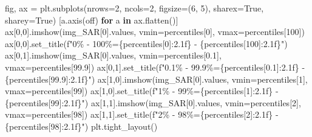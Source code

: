\documentclass[
  11pt,
  letterpaper,
  open=any,
  twoside=false,
  french]{scrbook}
\newenvironment{Shaded}{\begin{snugshade}}{\end{snugshade}}
\newcommand{\ControlFlowTok}[1]{\textcolor[rgb]{0.00,0.23,0.31}{\textbf{#1}}}
\newcommand{\DecValTok}[1]{\textcolor[rgb]{0.68,0.00,0.00}{#1}}
\newcommand{\FloatTok}[1]{\textcolor[rgb]{0.68,0.00,0.00}{#1}}
\newcommand{\KeywordTok}[1]{\textcolor[rgb]{0.00,0.23,0.31}{\textbf{#1}}}
\newcommand{\NormalTok}[1]{\textcolor[rgb]{0.00,0.23,0.31}{#1}}
\newcommand{\OperatorTok}[1]{\textcolor[rgb]{0.37,0.37,0.37}{#1}}
\newcommand{\SpecialCharTok}[1]{\textcolor[rgb]{0.37,0.37,0.37}{#1}}
\newcommand{\SpecialStringTok}[1]{\textcolor[rgb]{0.13,0.47,0.30}{#1}}
\newcommand{\StringTok}[1]{\textcolor[rgb]{0.13,0.47,0.30}{#1}}
\newcommand{\VariableTok}[1]{\textcolor[rgb]{0.07,0.07,0.07}{#1}}
\begin{document}
\begin{Shaded}
\begin{Highlighting}[]
\NormalTok{fig, ax }\OperatorTok{=}\NormalTok{ plt.subplots(nrows}\OperatorTok{=}\DecValTok{2}\NormalTok{, ncols}\OperatorTok{=}\DecValTok{2}\NormalTok{, figsize}\OperatorTok{=}\NormalTok{(}\DecValTok{6}\NormalTok{, }\DecValTok{5}\NormalTok{), sharex}\OperatorTok{=}\VariableTok{True}\NormalTok{, sharey}\OperatorTok{=}\VariableTok{True}\NormalTok{)}
\NormalTok{[a.axis(}\StringTok{\textquotesingle{}off\textquotesingle{}}\NormalTok{) }\ControlFlowTok{for}\NormalTok{ a }\KeywordTok{in}\NormalTok{ ax.flatten()]}
\NormalTok{ax[}\DecValTok{0}\NormalTok{,}\DecValTok{0}\NormalTok{].imshow(img\_SAR[}\DecValTok{0}\NormalTok{].values, vmin}\OperatorTok{=}\NormalTok{percentiles[}\DecValTok{0}\NormalTok{], vmax}\OperatorTok{=}\NormalTok{percentiles[}\DecValTok{100}\NormalTok{])}
\NormalTok{ax[}\DecValTok{0}\NormalTok{,}\DecValTok{0}\NormalTok{].set\_title(}\SpecialStringTok{f"0\% {-} 100\%=}\SpecialCharTok{\{}\NormalTok{percentiles[}\DecValTok{0}\NormalTok{]}\SpecialCharTok{:2.1f\}}\SpecialStringTok{ {-} }\SpecialCharTok{\{}\NormalTok{percentiles[}\DecValTok{100}\NormalTok{]}\SpecialCharTok{:2.1f\}}\SpecialStringTok{"}\NormalTok{)}
\NormalTok{ax[}\DecValTok{0}\NormalTok{,}\DecValTok{1}\NormalTok{].imshow(img\_SAR[}\DecValTok{0}\NormalTok{].values, vmin}\OperatorTok{=}\NormalTok{percentiles[}\FloatTok{0.1}\NormalTok{], vmax}\OperatorTok{=}\NormalTok{percentiles[}\FloatTok{99.9}\NormalTok{]) }
\NormalTok{ax[}\DecValTok{0}\NormalTok{,}\DecValTok{1}\NormalTok{].set\_title(}\SpecialStringTok{f"0.1\% {-} 99.9\%=}\SpecialCharTok{\{}\NormalTok{percentiles[}\FloatTok{0.1}\NormalTok{]}\SpecialCharTok{:2.1f\}}\SpecialStringTok{ {-} }\SpecialCharTok{\{}\NormalTok{percentiles[}\FloatTok{99.9}\NormalTok{]}\SpecialCharTok{:2.1f\}}\SpecialStringTok{"}\NormalTok{)}
\NormalTok{ax[}\DecValTok{1}\NormalTok{,}\DecValTok{0}\NormalTok{].imshow(img\_SAR[}\DecValTok{0}\NormalTok{].values, vmin}\OperatorTok{=}\NormalTok{percentiles[}\DecValTok{1}\NormalTok{], vmax}\OperatorTok{=}\NormalTok{percentiles[}\DecValTok{99}\NormalTok{]) }
\NormalTok{ax[}\DecValTok{1}\NormalTok{,}\DecValTok{0}\NormalTok{].set\_title(}\SpecialStringTok{f"1\% {-} 99\%=}\SpecialCharTok{\{}\NormalTok{percentiles[}\DecValTok{1}\NormalTok{]}\SpecialCharTok{:2.1f\}}\SpecialStringTok{ {-} }\SpecialCharTok{\{}\NormalTok{percentiles[}\DecValTok{99}\NormalTok{]}\SpecialCharTok{:2.1f\}}\SpecialStringTok{"}\NormalTok{)}
\NormalTok{ax[}\DecValTok{1}\NormalTok{,}\DecValTok{1}\NormalTok{].imshow(img\_SAR[}\DecValTok{0}\NormalTok{].values, vmin}\OperatorTok{=}\NormalTok{percentiles[}\DecValTok{2}\NormalTok{], vmax}\OperatorTok{=}\NormalTok{percentiles[}\DecValTok{98}\NormalTok{]) }
\NormalTok{ax[}\DecValTok{1}\NormalTok{,}\DecValTok{1}\NormalTok{].set\_title(}\SpecialStringTok{f"2\% {-} 98\%=}\SpecialCharTok{\{}\NormalTok{percentiles[}\DecValTok{2}\NormalTok{]}\SpecialCharTok{:2.1f\}}\SpecialStringTok{ {-} }\SpecialCharTok{\{}\NormalTok{percentiles[}\DecValTok{98}\NormalTok{]}\SpecialCharTok{:2.1f\}}\SpecialStringTok{"}\NormalTok{)}
\NormalTok{plt.tight\_layout()}
\end{Highlighting}
\end{Shaded}
\end{document}
